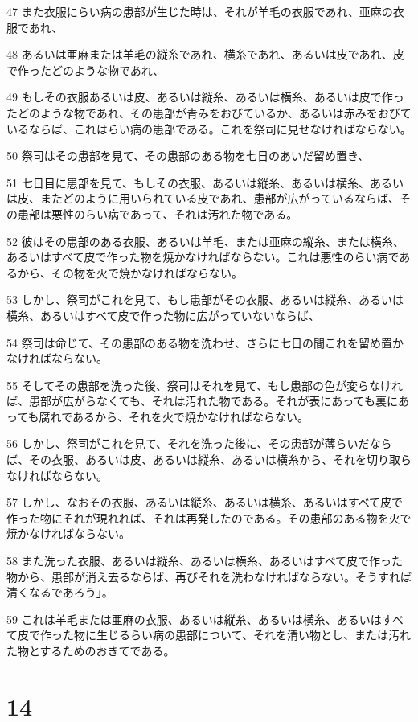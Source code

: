 \par 47 また衣服にらい病の患部が生じた時は、それが羊毛の衣服であれ、亜麻の衣服であれ、
\par 48 あるいは亜麻または羊毛の縦糸であれ、横糸であれ、あるいは皮であれ、皮で作ったどのような物であれ、
\par 49 もしその衣服あるいは皮、あるいは縦糸、あるいは横糸、あるいは皮で作ったどのような物であれ、その患部が青みをおびているか、あるいは赤みをおびているならば、これはらい病の患部である。これを祭司に見せなければならない。
\par 50 祭司はその患部を見て、その患部のある物を七日のあいだ留め置き、
\par 51 七日目に患部を見て、もしその衣服、あるいは縦糸、あるいは横糸、あるいは皮、またどのように用いられている皮であれ、患部が広がっているならば、その患部は悪性のらい病であって、それは汚れた物である。
\par 52 彼はその患部のある衣服、あるいは羊毛、または亜麻の縦糸、または横糸、あるいはすべて皮で作った物を焼かなければならない。これは悪性のらい病であるから、その物を火で焼かなければならない。
\par 53 しかし、祭司がこれを見て、もし患部がその衣服、あるいは縦糸、あるいは横糸、あるいはすべて皮で作った物に広がっていないならば、
\par 54 祭司は命じて、その患部のある物を洗わせ、さらに七日の間これを留め置かなければならない。
\par 55 そしてその患部を洗った後、祭司はそれを見て、もし患部の色が変らなければ、患部が広がらなくても、それは汚れた物である。それが表にあっても裏にあっても腐れであるから、それを火で焼かなければならない。
\par 56 しかし、祭司がこれを見て、それを洗った後に、その患部が薄らいだならば、その衣服、あるいは皮、あるいは縦糸、あるいは横糸から、それを切り取らなければならない。
\par 57 しかし、なおその衣服、あるいは縦糸、あるいは横糸、あるいはすべて皮で作った物にそれが現れれば、それは再発したのである。その患部のある物を火で焼かなければならない。
\par 58 また洗った衣服、あるいは縦糸、あるいは横糸、あるいはすべて皮で作った物から、患部が消え去るならば、再びそれを洗わなければならない。そうすれば清くなるであろう」。
\par 59 これは羊毛または亜麻の衣服、あるいは縦糸、あるいは横糸、あるいはすべて皮で作った物に生じるらい病の患部について、それを清い物とし、または汚れた物とするためのおきてである。

\chapter{14}

